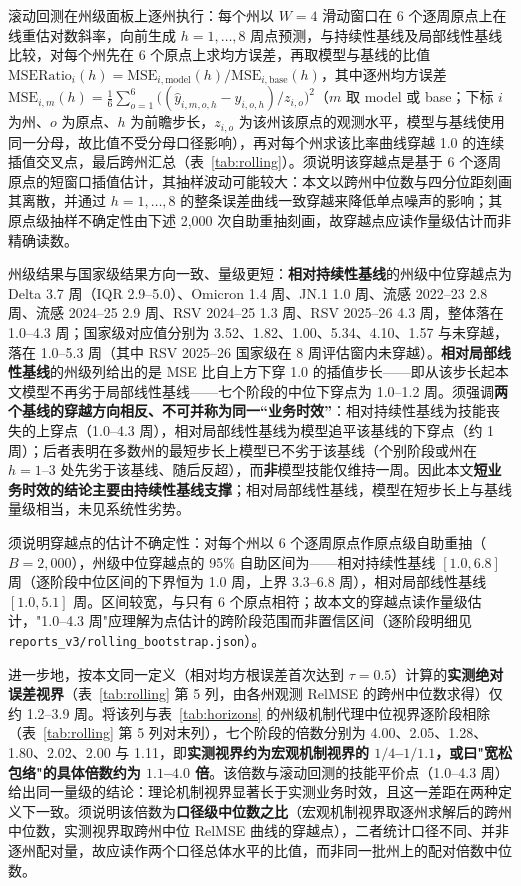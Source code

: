 \documentclass[11pt,a4paper]{article}
\theoremstyle{plain}
\theoremstyle{definition}
\begin{document}
滚动回测在州级面板上逐州执行：每个州以 $W=4$ 滑动窗口在 6 个逐周原点上在线重估对数斜率，向前生成 $h=1,\dots,8$ 周点预测，与持续性基线及局部线性基线比较，对每个州先在 6 个原点上求均方误差，再取模型与基线的比值 $\text{MSERatio}_{i}(h) = \text{MSE}_{i,\text{model}}(h)/\text{MSE}_{i,\text{base}}(h)$，其中逐州均方误差 $\text{MSE}_{i,m}(h) = \frac16\sum_{o=1}^{6}\big((\hat y_{i,m,o,h}-y_{i,o,h})/z_{i,o}\big)^2$（$m$ 取 model 或 base；下标 $i$ 为州、$o$ 为原点、$h$ 为前瞻步长，$z_{i,o}$ 为该州该原点的观测水平，模型与基线使用同一分母，故比值不受分母口径影响），再对每个州求该比率曲线穿越 1.0 的连续插值交叉点，最后跨州汇总（表~\ref{tab:rolling}）。须说明该穿越点是基于 6 个逐周原点的短窗口插值估计，其抽样波动可能较大：本文以跨州中位数与四分位距刻画其离散，并通过 $h=1,\dots,8$ 的整条误差曲线一致穿越来降低单点噪声的影响；其原点级抽样不确定性由下述 2,000 次自助重抽刻画，故穿越点应读作量级估计而非精确读数。

州级结果与国家级结果方向一致、量级更短：\textbf{相对持续性基线}的州级中位穿越点为 Delta 3.7 周（IQR 2.9--5.0）、Omicron 1.4 周、JN.1 1.0 周、流感 2022--23 2.8 周、流感 2024--25 2.9 周、RSV 2024--25 1.3 周、RSV 2025--26 4.3 周，整体落在 1.0--4.3 周；国家级对应值分别为 3.52、1.82、1.00、5.34、4.10、1.57 与未穿越，落在 1.0--5.3 周（其中 RSV 2025--26 国家级在 8 周评估窗内未穿越）。\textbf{相对局部线性基线}的州级列给出的是 MSE 比自上方下穿 1.0 的插值步长——即从该步长起本文模型不再劣于局部线性基线——七个阶段的中位下穿点为 1.0--1.2 周。须强调\textbf{两个基线的穿越方向相反、不可并称为同一“业务时效”}：相对持续性基线为技能丧失的上穿点（1.0--4.3 周），相对局部线性基线为模型追平该基线的下穿点（约 1 周）；后者表明在多数州的最短步长上模型已不劣于该基线（个别阶段或州在 $h=1$--$3$ 处先劣于该基线、随后反超），而\textbf{非}模型技能仅维持一周。因此本文\textbf{短业务时效的结论主要由持续性基线支撑}；相对局部线性基线，模型在短步长上与基线量级相当，未见系统性劣势。

须说明穿越点的估计不确定性：对每个州以 6 个逐周原点作原点级自助重抽（$B=2{,}000$），州级中位穿越点的 95\% 自助区间为——相对持续性基线 $[1.0, 6.8]$ 周（逐阶段中位区间的下界恒为 1.0 周，上界 3.3--6.8 周），相对局部线性基线 $[1.0, 5.1]$ 周。区间较宽，与只有 6 个原点相符；故本文的穿越点读作量级估计，"1.0--4.3 周"应理解为点估计的跨阶段范围而非置信区间（逐阶段明细见 \texttt{reports\_v3/rolling\_bootstrap.json}）。

进一步地，按本文同一定义（相对均方根误差首次达到 $\tau = 0.5$）计算的\textbf{实测绝对误差视界}（表~\ref{tab:rolling} 第 5 列，由各州观测 RelMSE 的跨州中位数求得）仅约 1.2--3.9 周。将该列与表~\ref{tab:horizons} 的州级机制代理中位视界逐阶段相除（表~\ref{tab:rolling} 第 5 列对末列），七个阶段的倍数分别为 4.00、2.05、1.28、1.80、2.02、2.00 与 1.11，即\textbf{实测视界约为宏观机制视界的 $1/4$--$1/1.1$，或曰"宽松包络"的具体倍数约为 $1.1$--$4.0$ 倍}。该倍数与滚动回测的技能平价点（1.0--4.3 周）给出同一量级的结论：理论机制视界显著长于实测业务时效，且这一差距在两种定义下一致。须说明该倍数为\textbf{口径级中位数之比}（宏观机制视界取逐州求解后的跨州中位数，实测视界取跨州中位 RelMSE 曲线的穿越点），二者统计口径不同、并非逐州配对量，故应读作两个口径总体水平的比值，而非同一批州上的配对倍数中位数。
\end{document}

